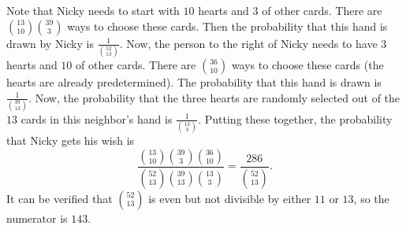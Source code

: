 Note that Nicky needs to start with $10$ hearts and $3$ of other cards. There are $\binom{13}{10}\binom{39}{3}$ ways to choose these cards. Then the probability that this hand is drawn by Nicky is $\frac{1}{\binom{52}{13}}$. Now, the person to the right of Nicky needs to have $3$ hearts and $10$ of other cards. There are $\binom{36}{10}$ ways to choose these cards (the hearts are already predetermined). The probability that this hand is drawn is $\frac{1}{\binom{39}{13}}$. Now, the probability that the three hearts are randomly selected out of the $13$ cards in this neighbor's hand is $\frac{1}{\binom{13}{3}}$. Putting these together, the probability that Nicky gets his wish is \[\frac{\binom{13}{10}\binom{39}{3}\binom{36}{10}}{\binom{52}{13}\binom{39}{13}\binom{13}{3}}=\frac{286}{\binom{52}{13}}.\] It can be verified that $\binom{52}{13}$ is even but not divisible by either $11$ or $13$, so the numerator is $\boxed{143}$.